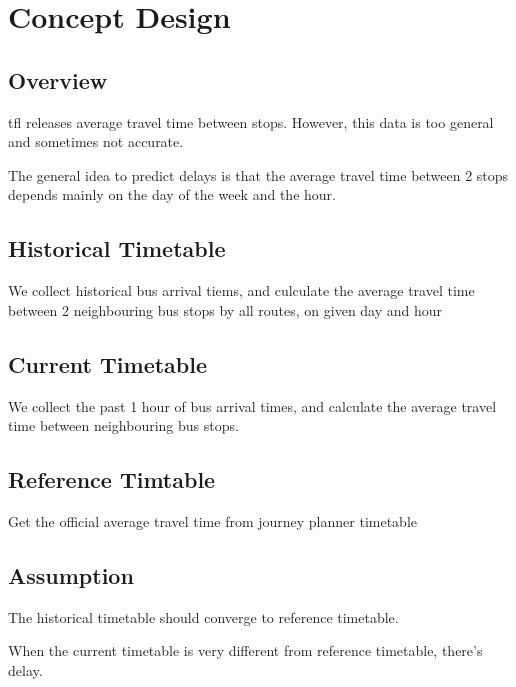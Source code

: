 \chapter{Concept Design}
\section{Overview}
\par \acrshort{tfl} releases average travel time between stops. However, this data is too general and sometimes not accurate.

\par The general idea to predict delays is that the average travel time between 2 stops depends mainly on the day of the week and the hour.

\section{Historical Timetable}
\par We collect historical bus arrival tiems, and culculate the average travel time between 2 neighbouring bus stops by all routes, on given day and hour

\section{Current Timetable}
\par We collect the past 1 hour of bus arrival times, and calculate the average travel time between neighbouring bus stops.

\section{Reference Timtable}
\par Get the official average travel time from journey planner timetable

\section{Assumption}
\par The historical timetable should converge to reference timetable.

\par When the current timetable is very different from reference timetable, there's delay.
